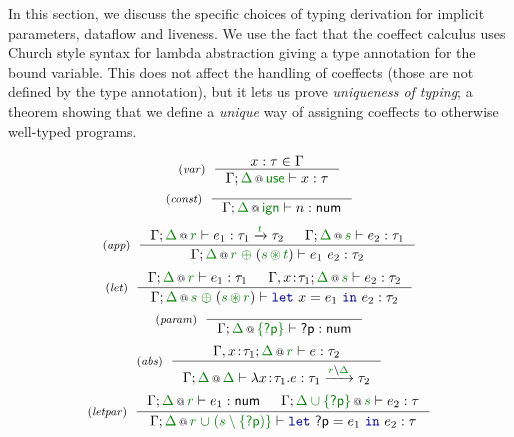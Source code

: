 In this section, we discuss the specific choices of typing derivation for implicit parameters,
dataflow and liveness. We use the fact that the coeffect calculus uses Church style syntax for
lambda abstraction giving a type annotation for the bound variable. This does not affect the
handling of coeffects (those are not defined by the type annotation), but it lets us prove
\emph{uniqueness of typing}; a theorem showing that we define a \emph{unique} way of assigning
coeffects to otherwise well-typed programs.


\begin{figure}[t]
\begin{equation*}
\tyrule{var}
  {x : \tau \in \Gamma}
  {\coctx{\Gamma;\cclrd{\Delta}}{\cunit} \vdash x : \tau }
\end{equation*}
\begin{equation*}
\tyrule{const}
  {~}
  {\coctx{\Gamma;\cclrd{\Delta}}{\czero} \vdash n : \ident{num} }
\end{equation*}
\begin{equation*}
\tyrule{app}
  {\coctx{\Gamma;\cclrd{\Delta}}{\cclrd{r}} \vdash e_1 : \tau_1 \xrightarrow{\cclrd{t}} \tau_2 &
   \coctx{\Gamma;\cclrd{\Delta}}{\cclrd{s}} \vdash e_2 : \tau_1 }
  {\coctx{\Gamma;\cclrd{\Delta}}{\cclrd{r} \;\cpar\; (\cclrd{s} \,\cseq\, \cclrd{t})} \vdash e_1~e_2 : \tau_2}
\end{equation*}
\begin{equation*}
\tyrule{let}
  { \coctx{\Gamma;\cclrd{\Delta}}{\cclrd{r}} \vdash e_1 : \tau_1 &
    \coctx{\Gamma, x\!:\!\tau_1;\cclrd{\Delta}}{\cclrd{s}} \vdash e_2 : \tau_2}
  {\coctx{\Gamma;\cclrd{\Delta}}{\cclrd{s} \;\cpar\; (\cclrd{s} \,\cseq\, \cclrd{r})} \vdash \kvd{let}~x=e_1~\kvd{in}~e_2 : \tau_2 }
\end{equation*}
\begin{equation*}
\tyrule{param}
  { ~ }
  { \coctx{\Gamma;\cclrd{\Delta}}{\cclrd{ \{ \ident{?p} \} }} \vdash \ident{?p} : \ident{num} }
\end{equation*}
\begin{equation*}
\tyrule{abs}
  {\coctx{\Gamma, x\!:\!\tau_1;\cclrd{\Delta}}{\cclrd{r}} \vdash e : \tau_2}
  {\coctx{\Gamma;\cclrd{\Delta}}{\cclrd{\Delta}} \vdash \lambda x\!:\!\tau_1.e : \tau_1 \xrightarrow{\cclrd{r}\setminus\cclrd{\Delta}} \tau_2 }
\end{equation*}
\begin{equation*}
\tyrule{letpar}
  { \coctx{\Gamma;\cclrd{\Delta}}{\cclrd{r}} \vdash e_1 : \ident{num} &
    \coctx{\Gamma;\cclrd{\Delta \cup \{ \ident{?p} \}}}{\cclrd{s}} \vdash e_2 : \tau}
  {\coctx{\Gamma;\cclrd{\Delta}}{\cclrd{r} \;\cclrd{\cup\; (\cclrd{s} \setminus \{ \ident{?p}) \}} } \vdash \kvd{let}~\ident{?p}=e_1~\kvd{in}~e_2 : \tau }
\end{equation*}

\label{fig:flat-resolve-impl}
\end{figure}

